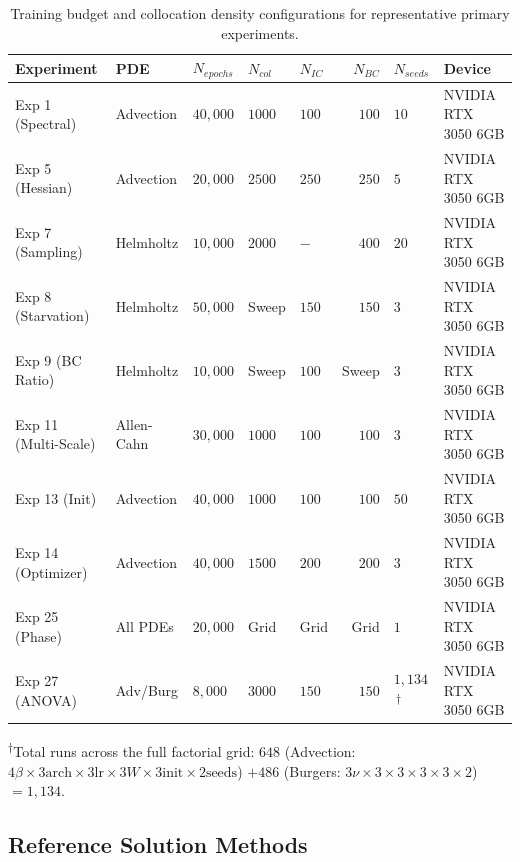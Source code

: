 \begin{table}[htpb]
    \centering
    \caption{Training budget and collocation density configurations for representative primary experiments.}
    \label{tab:app_budgets}
    \begin{tabular}{@{}lllllrll@{}}
        \toprule
        Experiment & PDE & $N_{epochs}$ & $N_{col}$ & $N_{IC}$ & $N_{BC}$ & $N_{seeds}$ & Device \\
        \midrule
        Exp 1 (Spectral) & Advection & $40,000$ & $1000$ & $100$ & $100$ & $10$ & NVIDIA RTX 3050 6GB \\
        Exp 5 (Hessian)  & Advection & $20,000$ & $2500$ & $250$ & $250$ & $5$ & NVIDIA RTX 3050 6GB \\
        Exp 7 (Sampling) & Helmholtz & $10,000$ & $2000$ & $-$ & $400$ & $20$ & NVIDIA RTX 3050 6GB \\
        Exp 8 (Starvation) & Helmholtz & $50,000$ & Sweep & $150$ & $150$ & $3$ & NVIDIA RTX 3050 6GB \\
        Exp 9 (BC Ratio) & Helmholtz & $10,000$ & Sweep & $100$ & Sweep & $3$ & NVIDIA RTX 3050 6GB \\
        Exp 11 (Multi-Scale) & Allen-Cahn & $30,000$ & $1000$ & $100$ & $100$ & $3$ & NVIDIA RTX 3050 6GB \\
        Exp 13 (Init) & Advection & $40,000$ & $1000$ & $100$ & $100$ & $50$ & NVIDIA RTX 3050 6GB \\
        Exp 14 (Optimizer) & Advection & $40,000$ & $1500$ & $200$ & $200$ & $3$ & NVIDIA RTX 3050 6GB \\
        Exp 25 (Phase)   & All PDEs & $20,000$ & Grid & Grid & Grid & $1$ & NVIDIA RTX 3050 6GB \\
        Exp 27 (ANOVA)   & Adv/Burg & $8{,}000$ & $3000$ & $150$ & $150$ & $1{,}134$\,\textsuperscript{$\dagger$} & NVIDIA RTX 3050 6GB \\
        \bottomrule
    \end{tabular}
\end{table}
\noindent\textsuperscript{$\dagger$}Total runs across the full factorial grid: $648$ (Advection: $4\beta \times 3 \text{arch} \times 3\text{lr} \times 3W \times 3\text{init} \times 2\text{seeds}$) $+ 486$ (Burgers: $3\nu \times 3 \times 3 \times 3 \times 3 \times 2$) $= 1{,}134$.

\subsection{Reference Solution Methods}
\label{app:reference}

